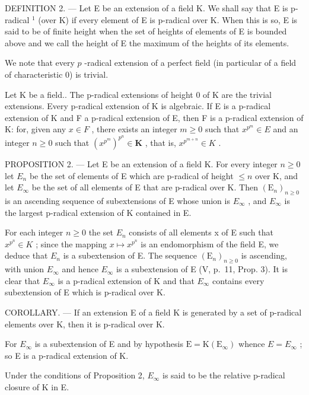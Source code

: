 DEFINITION 2. --- Let E be an extension of a field K. We shall say that E is p-radical \(^{1}\) (over K) if every element of E is p-radical over K. When this is so, E is said to be of finite height when the set of heights of elements of E is bounded above and we call the height of E the maximum of the heights of its elements.

We note that every \(p\) -radical extension of a perfect field (in particular of a field of characteristic 0) is trivial.

Let K be a field.. The p-radical extensions of height 0 of K are the trivial extensions. Every p-radical extension of K is algebraic. If E is a p-radical extension of K and F a p-radical extension of E, then F is a p-radical extension of K: for, given any \(x \in F\) , there exists an integer \(m \geqslant 0\) such that \(x^{p^{m}} \in E\) and an integer \(n \geqslant 0\) such that \((x^{p^{m}})^{p^{n}} \in \mathbf{K}\) , that is, \(x^{p^{m+n}} \in K\) .

PROPOSITION 2. --- Let E be an extension of a field K. For every integer \(n \geqslant 0\) let \(E_{n}\) be the set of elements of E which are p-radical of height \(\leqslant n\) over K, and let \(E_{\infty}\) be the set of all elements of E that are p-radical over K. Then \((\mathrm{E}_{n})_{n \geqslant 0}\) is an ascending sequence of subextensions of E whose union is \(E_{\infty}\) , and \(E_{\infty}\) is the largest p-radical extension of K contained in E.

For each integer \(n \geqslant 0\) the set \(E_{n}\) consists of all elements x of E such that \(x^{p^{n}} \in K\) ; since the mapping \(x \mapsto x^{p^{n}}\) is an endomorphism of the field E, we deduce that \(E_{n}\) is a subextension of E. The sequence \((\mathrm{E}_{n})_{n \geqslant 0}\) is ascending, with union \(E_{\infty}\) and hence \(E_{\infty}\) is a subextension of E (V, p.~11, Prop. 3). It is clear that \(E_{\infty}\) is a p-radical extension of K and that \(E_{\infty}\) contains every subextension of E which is p-radical over K.

COROLLARY. --- If an extension E of a field K is generated by a set of p-radical elements over K, then it is p-radical over K.

For \(E_{\infty}\) is a subextension of E and by hypothesis \(\mathrm{E} = \mathrm{K}(\mathrm{E}_{\infty})\) whence \(E = E_{\infty}\) ; so E is a p-radical extension of K.

Under the conditions of Proposition 2, \(E_{\infty}\) is said to be the relative p-radical closure of K in E.

